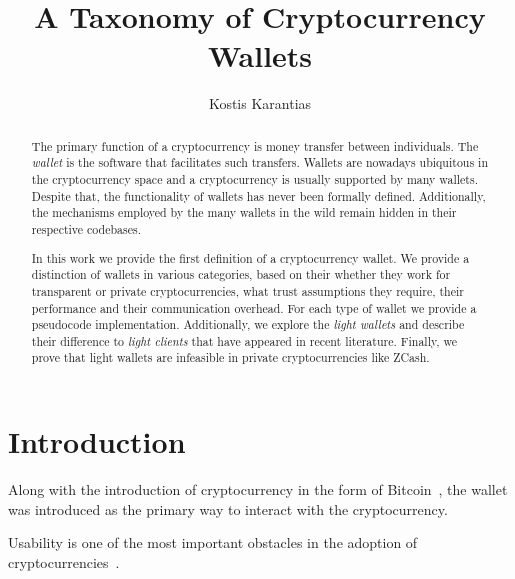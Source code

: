 \documentclass[sigconf,authordraft]{acmart}
\begin{document}
\title{A Taxonomy of Cryptocurrency Wallets}

\author{Kostis Karantias}

\renewcommand{\shortauthors}{Karantias}

\begin{abstract}
    The primary function of a cryptocurrency is money transfer between individuals. The \emph{wallet} is the software that facilitates such transfers. Wallets are nowadays ubiquitous in the cryptocurrency space and a cryptocurrency is usually supported by many wallets. Despite that, the functionality of wallets has never been formally defined. Additionally, the mechanisms employed by the many wallets in the wild remain hidden in their respective codebases.
    
    In this work we provide the first definition of a cryptocurrency wallet. We provide a distinction of wallets in various categories, based on their whether they work for transparent or private cryptocurrencies, what trust assumptions they require, their performance and their communication overhead. For each type of wallet we provide a pseudocode implementation. Additionally, we explore the \emph{light wallets} and describe their difference to \emph{light clients} that have appeared in recent literature. Finally, we prove that light wallets are infeasible in private cryptocurrencies like ZCash.
\end{abstract}

\maketitle

\section{Introduction}
Along with the introduction of cryptocurrency in the form of Bitcoin~\cite{bitcoin}, the wallet was introduced as the primary way to interact with the cryptocurrency.

Usability is one of the most important obstacles in the adoption of cryptocurrencies~\cite{meiklejohn2018top}.
\end{document}
